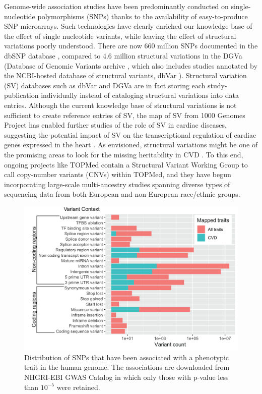 \documentclass[letter]{bioinfo}
\begin{document}
	
	Genome-wide association studies have been predominantly conducted on single-nucleotide polymorphisms (SNPs) thanks to the availability of easy-to-produce SNP microarrays. Such technologies have clearly enriched our knowledge base of the effect of single nucleotide variants, while leaving the effect of structural variations poorly understood. There are now 660 million SNPs documented in the dbSNP database \citep{NCBI:2018:dbSNP}, compared to 4.6 million structural variations in the DGVa (Database of Genomic Variants archive \citep{EMBL-EBI:2018:Database}, which also includes studies annotated by the NCBI-hosted database of structural variants, dbVar \citep{NCBI:2018:dbVar}).  Structural variation (SV) databases such as dbVar and DGVa are in fact storing each study-publication individually instead of cataloging structural variations into data entries. Although the current knowledge base of structural variations is not sufficient to create reference entries of SV, the map of SV from 1000 Genomes Project \citep{Sudmant:2015:integrated} has enabled further studies of the role of SV in cardiac diseases, suggesting the potential impact of SV on the transcriptional regulation of cardiac genes expressed in the heart \citep{Haas:2018:Genomic}. As envisioned, structural variations might be one of the promising areas to look for the missing heritability in CVD \citep{Eichler:2010:Missing}.  To this end, ongoing projects like TOPMed contain a Structural Variant Working Group to call copy-number variants (CNVs) within TOPMed, and they have begun incorporating large-scale multi-ancestry studies spanning diverse types of sequencing data from both European and non-European race/ethnic groups.  
	\begin{figure}[!tpb]
		\includegraphics[width=1\linewidth]{variant_contexts}
		\caption{Distribution of SNPs that have been associated with a phenotypic trait in the human genome. The associations are downloaded from NHGRI-EBI GWAS Catalog in which only those with p-value less than $10^{-5}$ were retained.}
		\label{fig:variant_context}
	\end{figure}
	
\end{document}
